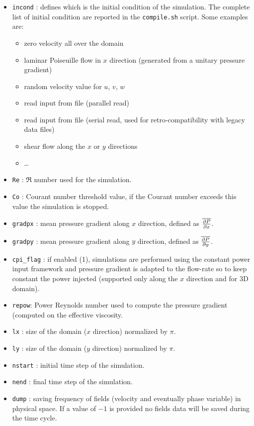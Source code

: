 \begin{itemize}[label={$\circ$}]
\item \texttt{incond} : defines which is the initial condition of the simulation. The complete list of initial condition are reported in the \texttt{compile.sh} script. Some examples are:
\begin{itemize}
\item zero velocity all over the domain
\item laminar Poiseuille flow in $x$ direction (generated from a unitary pressure gradient)
\item random velocity value for $u$, $v$, $w$
\item read input from file (parallel read)
\item read input from file (serial read, used for retro-compatibility with legacy data files)
\item shear flow along the $x$ or $y$ directions
\item \dots
\end{itemize}
\item \texttt{Re} : $\Re$ number used for the simulation.
\item \texttt{Co} : Courant number threshold value, if the Courant number exceeds this value the simulation is stopped.
\item \texttt{gradpx} : mean pressure gradient along $x$ direction, defined as $\overline{\frac{\partial P}{\partial x}}$.
\item \texttt{gradpy} : mean pressure gradient along $y$ direction, defined as $\overline{\frac{\partial P}{\partial y}}$.
\item \texttt{cpi\_flag} : if enabled (1), simulations are performed using the constant power input framework and pressure gradient is adapted to the flow-rate so to keep constant the power injected (supported only along the $x$ direction and for 3D domain).
\item \texttt{repow}: Power Reynolds number used to compute the pressure gradient (computed on the effective viscosity.
\item \texttt{lx} : size of the domain ($x$ direction) normalized by $\pi$.
\item \texttt{ly} : size of the domain ($y$ direction) normalized by $\pi$.
\item \texttt{nstart} : initial time step of the simulation.
\item \texttt{nend} : final time step of the simulation.
\item \texttt{dump} : saving frequency of fields (velocity and eventually phase variable) in physical space. If a value of $-1$ is provided no fields data will be saved during the time cycle.

\end{itemize}
